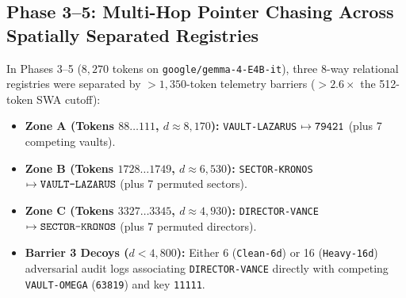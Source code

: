 \documentclass[11pt,letterpaper]{article}
\theoremstyle{definition}
\begin{document}
\subsection{Phase 3--5: Multi-Hop Pointer Chasing Across Spatially Separated Registries}
In Phases 3--5 ($8,270$ tokens on \texttt{google/gemma-4-E4B-it}), three 8-way relational registries were separated by $>1,350$-token telemetry barriers ($>2.6\times$ the 512-token SWA cutoff):
\begin{itemize}
    \item \textbf{Zone A (Tokens $88\dots 111$, $d \approx 8,170$):} \texttt{VAULT-LAZARUS} $\mapsto \text{\texttt{79421}}$ (plus 7 competing vaults).
    \item \textbf{Zone B (Tokens $1728\dots 1749$, $d \approx 6,530$):} \texttt{SECTOR-KRONOS} $\mapsto \text{\texttt{VAULT-LAZARUS}}$ (plus 7 permuted sectors).
    \item \textbf{Zone C (Tokens $3327\dots 3345$, $d \approx 4,930$):} \texttt{DIRECTOR-VANCE} $\mapsto \text{\texttt{SECTOR-KRONOS}}$ (plus 7 permuted directors).
    \item \textbf{Barrier 3 Decoys ($d < 4,800$):} Either 6 (\texttt{Clean-6d}) or 16 (\texttt{Heavy-16d}) adversarial audit logs associating \texttt{DIRECTOR-VANCE} directly with competing \texttt{VAULT-OMEGA} (\texttt{63819}) and key \texttt{11111}.
\end{itemize}
\end{document}
